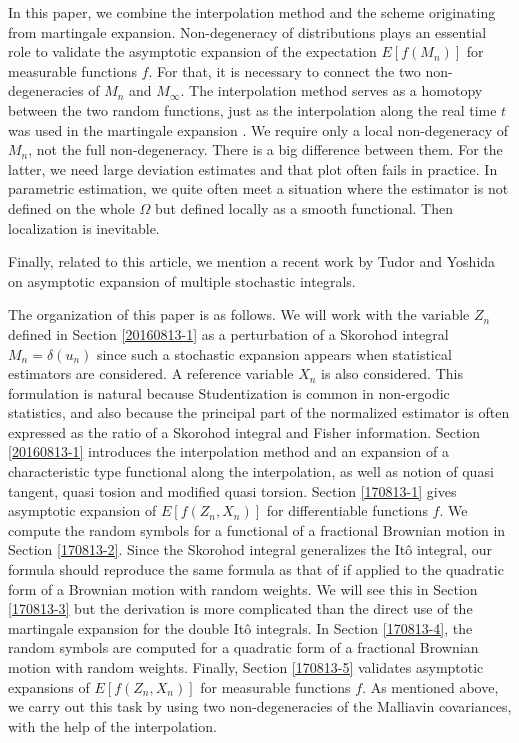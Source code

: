 \documentclass[a4paper]{article}
\numberwithin{equation}{section}
\begin{document}
In this paper, we combine the interpolation method and the scheme originating from martingale expansion. 
Non-degeneracy of distributions plays an essential role to validate the asymptotic expansion 
of the expectation $E[f(M_n)]$ for measurable functions $f$. 
For that, it is necessary to connect the two non-degeneracies of $M_n$ and $M_\infty$. 
The interpolation method serves as a homotopy between the two random functions, 
just as the interpolation along the real time $t$ was used in 
the martingale expansion \cite{yoshida2013martingale}. 
We require only a local non-degeneracy of $M_n$, not the full non-degeneracy. 
There is a big difference between them. For the latter, we need large deviation estimates and 
that plot often fails in practice. In parametric estimation, we quite often meet a situation where the estimator is not 
defined on the whole $\Omega$ but defined locally as a smooth functional. Then localization is inevitable. 
 

Finally, related to this article, 
we mention a recent work by 
Tudor and Yoshida \cite{tudoryoshida2017} on  
asymptotic expansion of multiple stochastic integrals. 
 
The organization of this paper is as follows. 
We will work with the variable $Z_n$ defined in Section \ref{20160813-1}  
as a perturbation of a Skorohod integral $M_n=\delta(u_n)$ since such 
a stochastic expansion appears 
when statistical estimators are considered. 
A reference variable $X_n$ is also considered. 
This formulation is natural because Studentization is common in non-ergodic statistics, 
and also because the principal part of the normalized estimator is often expressed as the ratio of a Skorohod integral and 
Fisher information. 
Section \ref{20160813-1} introduces the interpolation method and an expansion of a characteristic type functional 
along the interpolation, 
as well as notion of quasi tangent, quasi tosion and modified quasi torsion. 
Section \ref{170813-1} gives asymptotic expansion of $E[f(Z_n,X_n)]$ for differentiable functions $f$. 
We compute the random symbols for a functional of a fractional Brownian motion in Section \ref{170813-2}. 
Since the Skorohod integral generalizes the It\^o integral, our formula should reproduce the same formula as 
that of \cite{yoshida2013martingale} 
if applied to the quadratic form of a Brownian motion with random weights. We will see this in Section \ref{170813-3} 
but the derivation is more complicated than the direct use of the martingale expansion %
for 
the double It\^o integrals. 
In Section \ref{170813-4}, the random symbols are computed for a quadratic form of a fractional Brownian motion 
with random weights. 
Finally, Section \ref{170813-5} validates asymptotic expansions of $E[f(Z_n,X_n)]$ for measurable functions $f$. 
As mentioned above, we carry out this task by using two non-degeneracies of the Malliavin covariances, 
with the help of the interpolation. 
\end{document}
